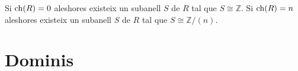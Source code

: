 \documentclass[../../Main.tex]{subfiles}
\begin{document}
	\begin{corollary}
		\label{corollary:subcos isomorf respecte caracteristica}
		Si \(\operatorname{ch}(R)=0\) aleshores existeix un subanell \(S\) de \(R\) tal que \(S\cong\mathbb{Z}\). Si \(\operatorname{ch}(R)=n\) aleshores existeix un subanell \(S\) de \(R\) tal que \(S\cong\mathbb{Z}/(n)\).
	\end{corollary}
\section{Dominis}
\end{document}
